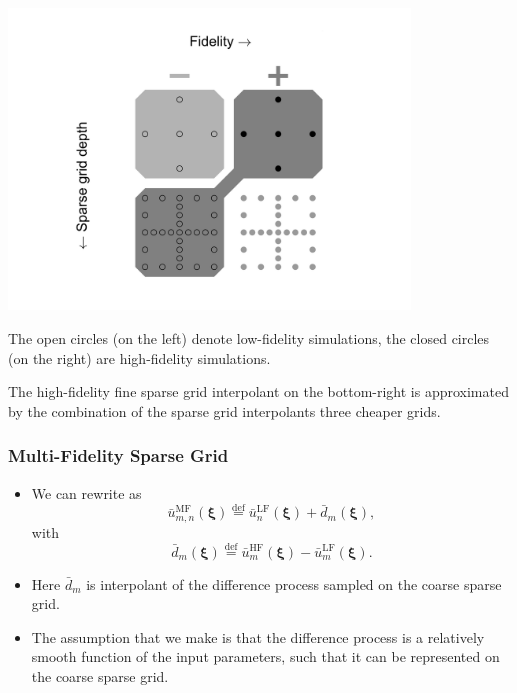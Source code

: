 \documentclass[11pt,ucs]{beamer}
\begin{document}
\begin{frame}%


\begin{center}
\includegraphics[width=0.8\textwidth]{combination_multifi}
\end{center}

The open circles (on the left) denote low-fidelity simulations, the closed circles (on the right) are high-fidelity simulations.  

The high-fidelity fine sparse grid interpolant on the bottom-right is approximated by the combination of the sparse grid interpolants three cheaper grids. 


\end{frame}


\begin{frame}\frametitle{Multi-Fidelity Sparse Grid}

\begin{itemize}
\item We can rewrite as
%
\begin{equation*}
\bar u_{m,n}^\text{MF}(\boldsymbol{\xi})  \overset{\text{def}}{=} \bar u_n^\text{LF}(\boldsymbol{\xi})  + \bar d_m(\boldsymbol{\xi}) ,
\end{equation*}
%
with
%
\begin{equation*}
\bar d_m(\boldsymbol{\xi}) \overset{\text{def}}{=} \bar u_m^\text{HF}({\boldsymbol{\xi}}) - \bar u_m^\text{LF}({\boldsymbol{\xi}}) .
\end{equation*}
%
\item
Here $\bar d_m$ is interpolant of the difference process sampled on the coarse sparse grid. 

\item The assumption that we make is that the difference process is a relatively smooth function of the input parameters, such that it can be represented on the coarse sparse grid.


\end{itemize}

\end{frame}
\end{document}
